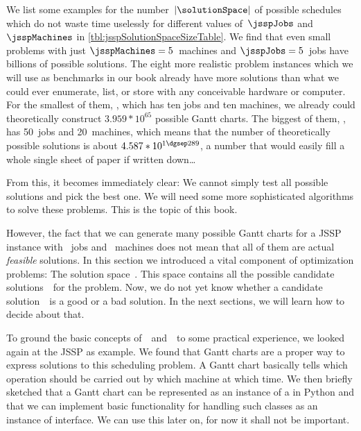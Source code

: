 %
We list some examples for the number~$\left|\solutionSpace\right|$ of possible schedules which do not waste time uselessly for different values of~$\jsspJobs$ and~$\jsspMachines$ in \autoref{tbl:jsspSolutionSpaceSizeTable}.
We find that even small problems with just $\jsspMachines=5$~machines and $\jsspJobs=5$~jobs have billions of possible solutions.
The eight more realistic problem instances which we will use as benchmarks in our book already have more solutions than what we could ever enumerate, list, or store with any conceivable hardware or computer.
For the smallest of them, , which has ten jobs and ten machines, we already could theoretically construct $3.959*10^{65}$ possible Gantt charts.
The biggest of them, , has 50~jobs and 20~machines, which means that the number of theoretically possible solutions is about $4.587*10^{1\dgsep289}$, a number that would easily fill a whole single sheet of paper if written down\dots\relax

From this, it becomes immediately clear:
We cannot simply test all possible solutions and pick the best one.
We will need some more sophisticated algorithms to solve these problems.
This is the topic of this book.

However, the fact that we can generate many possible Gantt charts for a \gls{JSSP} instance with \jsspJobs~jobs and \jsspMachines~machines does not mean that all of them are actual \emph{feasible} solutions.%
\endhsection%
\endhsection%
%
%
%
In this section we introduced a vital component of optimization problems: The solution space~\solutionSpace.
This space contains all the possible candidate solutions~\solspel\ for the problem.
Now, we do not yet know whether a candidate solution~\solspel\ is a good or a bad solution.
In the next sections, we will learn how to decide about that.

To ground the basic concepts of~\solutionSpace\ and~\solspel\ to some practical experience, we looked again at the \gls{JSSP} as example.
We found that Gantt charts are a proper way to express solutions to this scheduling problem.
A Gantt chart basically tells which operation should be carried out by which machine at which time.
We then briefly sketched that a Gantt chart can be represented as an instance of a  in Python and that we can implement basic functionality for handling such classes as an instance of  interface.
We can use this later on, for now it shall not be important.

